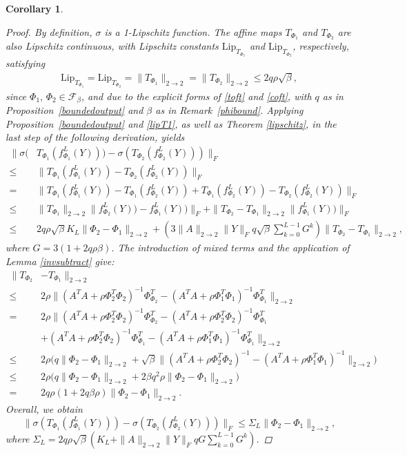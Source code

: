 \documentclass[preprint,12pt]{elsarticle}
\newtheorem{corollary}[theorem]{Corollary}
\newcommand{\opnorm}{2\rightarrow2}
\begin{document}
\begin{corollary}
\begin{proof}
    By definition, $\sigma$ is a 1-Lipschitz function. The affine maps $T_{\Phi_1}$ and $T_{\Phi_2}$ are also Lipschitz continuous, with Lipschitz constants $\mathrm{Lip}_{T_{\Phi_1}}$ and $\mathrm{Lip}_{T_{\Phi_2}}$, respectively, satisfying
    \begin{align}
        \label{lipT1}
        \mathrm{Lip}_{T_{\Phi_1}}=\mathrm{Lip}_{T_{\Phi_2}}=\|T_{\Phi_1}\|_{\opnorm}=\|T_{\Phi_2}\|_{\opnorm}\leq2q\rho\sqrt{\beta },
    \end{align}
since $\Phi_1,\,\Phi_2\in\mathcal{F}_{\beta }$, and due to the explicit forms of \eqref{toft} and \eqref{coft}, with $q$ as in Proposition~\ref{boundedoutput} and $\beta$ as in Remark~\ref{phibound}. Applying Proposition~\ref{boundedoutput} and \eqref{lipT1}, as well as Theorem \ref{lipschitz}, in the last step of the following derivation, yields
\begin{align*}
    \|\sigma(&T_{\Phi_1}(f^L_{\Phi_1}(Y)))-\sigma(T_{\Phi_2}(f^L_{\Phi_2}(Y)))\|_F\\
    \leq&\|T_{\Phi_1}(f^L_{\Phi_1}(Y))-T_{\Phi_2}(f^L_{\Phi_2}(Y))\|_F\\
    =&\|T_{\Phi_1}(f^L_{\Phi_1}(Y))-T_{\Phi_1}(f^L_{\Phi_2}(Y))+T_{\Phi_1}(f^L_{\Phi_2}(Y))-T_{\Phi_2}(f^L_{\Phi_2}(Y))\|_F\\
    \leq&\|T_{\Phi_1}\|_{\opnorm}\|f^L_{\Phi_2}(Y))-f^L_{\Phi_1}(Y))\|_F+\|T_{\Phi_2}-T_{\Phi_1}\|_{\opnorm}\|f^L_{\Phi_1}(Y))\|_F\\
    \leq&2q\rho\sqrt{\beta }K_L\|\Phi_2-\Phi_1\|_{\opnorm}+\left(3\|A\|_{\opnorm}\|Y\|_Fq\sqrt{\beta}\sum_{k=0}^{L-1}G^k\right)\|T_{\Phi_2}-T_{\Phi_1}\|_{\opnorm},
\end{align*}
where $G=3(1+2q\rho\beta)$. The introduction of mixed terms and the application of Lemma \ref{invsubtract} give:
\begin{align*}
    \|T_{\Phi_2}&-T_{\Phi_1}\|_{\opnorm}\\
    \leq&2\rho\|(A^TA+\rho\Phi_2^T\Phi_2)^{-1}\Phi^T_{\Phi_2}-(A^TA+\rho\Phi_1^T\Phi_1)^{-1}\Phi^T_{\Phi_1}\|_{\opnorm}\\
    =&2\rho\|(A^TA+\rho\Phi_2^T\Phi_2)^{-1}\Phi^T_{\Phi_2}-(A^TA+\rho\Phi_2^T\Phi_2)^{-1}\Phi^T_{\Phi_1}\\
    &+(A^TA+\rho\Phi_2^T\Phi_2)^{-1}\Phi^T_{\Phi_1}-(A^TA+\rho\Phi_1^T\Phi_1)^{-1}\Phi^T_{\Phi_1}\|_{\opnorm}\\
    \leq&2\rho\bigg(q\|\Phi_2-\Phi_1\|_{\opnorm}+\sqrt{\beta }\|(A^TA+\rho\Phi_2^T\Phi_2)^{-1}-(A^TA+\rho\Phi_1^T\Phi_1)^{-1}\|_{\opnorm}\bigg)\\
    \leq&2\rho\bigg(q\|\Phi_2-\Phi_1\|_{\opnorm}+2\beta q^2\rho\|\Phi_2-\Phi_1\|_{\opnorm}\bigg)\\
    =&2q\rho(1+2q\beta\rho)\|\Phi_2-\Phi_1\|_{\opnorm}.
\end{align*}
Overall, we obtain
\begin{equation}
    \|\sigma(T_{\Phi_1}(f^L_{\Phi_1}(Y)))-\sigma(T_{\Phi_2}(f^L_{\Phi_2}(Y)))\|_F\leq\Sigma_L\|\Phi_2-\Phi_1\|_{\opnorm},
\end{equation}
where $\Sigma_L=2q\rho\sqrt{\beta}\left(K_L+\|A\|_{\opnorm}\|Y\|_FqG\sum_{k=0}^{L-1}G^k\right)$.
\end{proof}


\end{corollary}
\end{document}
